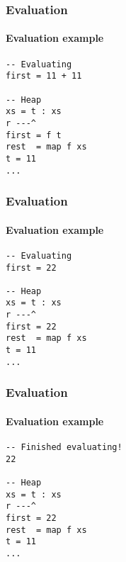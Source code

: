 \documentclass{beamer}
\begin{document}
\begin{frame}[t,fragile]
\frametitle{Evaluation}
\framesubtitle{Evaluation example}
\begin{verbatim}
-- Evaluating
first = 11 + 11

-- Heap
xs = t : xs
r ---^
first = f t
rest  = map f xs
t = 11
...
\end{verbatim}
\end{frame}

\begin{frame}[t,fragile]
\frametitle{Evaluation}
\framesubtitle{Evaluation example}
\begin{verbatim}
-- Evaluating
first = 22

-- Heap
xs = t : xs
r ---^
first = 22
rest  = map f xs
t = 11
...
\end{verbatim}
\end{frame}

\begin{frame}[t,fragile]
\frametitle{Evaluation}
\framesubtitle{Evaluation example}
\begin{verbatim}
-- Finished evaluating!
22

-- Heap
xs = t : xs
r ---^
first = 22
rest  = map f xs
t = 11
...
\end{verbatim}
\end{frame}
\end{document}
